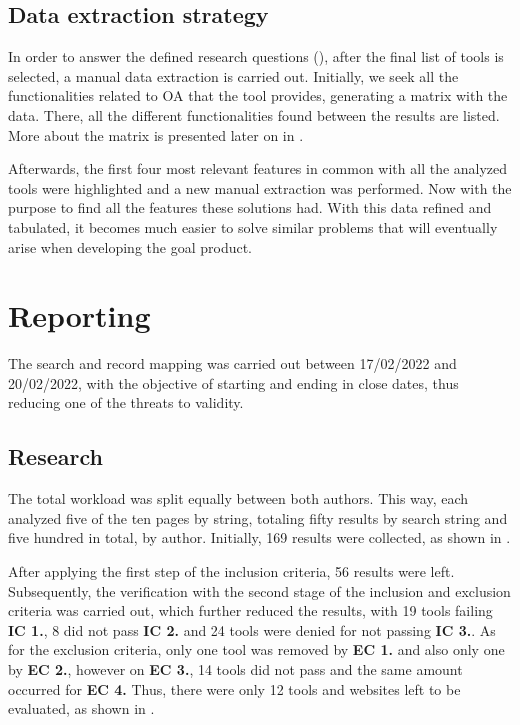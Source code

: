 

\subsection{Data extraction strategy}\label{sec:gl-planning-datastrategy}

In order to answer the defined research questions (), after the final list of tools is selected, a manual data extraction is carried out. Initially, we seek all the functionalities related to \ac{OA} that the tool provides, generating a matrix with the data. There, all the different functionalities found between the results are listed. More about the matrix is presented later on in .

Afterwards, the first four most relevant features in common with all the analyzed tools were highlighted and a new manual extraction was performed. Now with the purpose to find all the features these solutions had. With this data refined and tabulated, it becomes much easier to solve similar problems that will eventually arise when developing the goal product.

\section{Reporting}\label{sec:gl-reporting}

The search and record mapping was carried out between 17/02/2022 and 20/02/2022, with the objective of starting and ending in close dates, thus reducing one of the threats to validity.

\subsection{Research}\label{sec:gl-research}

The total workload was split equally between both authors. This way, each analyzed five of the ten pages by string, totaling fifty results by search string and five hundred in total, by author. Initially, 169 results were collected, as shown in .

After applying the first step of the inclusion criteria, 56 results were left. Subsequently, the verification with the second stage of the inclusion and exclusion criteria was carried out, which further reduced the results, with 19 tools failing \textbf{IC 1.}, 8 did not pass \textbf{IC 2.} and 24 tools were denied for not passing \textbf{IC 3.}. As for the exclusion criteria, only one tool was removed by \textbf{EC 1.} and also only one by \textbf{EC 2.}, however on \textbf{EC 3.}, 14 tools did not pass and the same amount occurred for \textbf{EC 4.} Thus, there were only 12 tools and websites left to be evaluated, as shown in .

